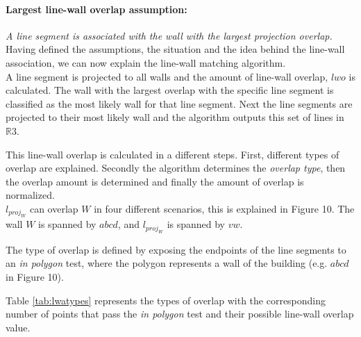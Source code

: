 	\paragraph{Largest line-wall overlap assumption:}
	\emph{A line segment is associated with the wall with the largest projection
	overlap.}\\
	Having defined the assumptions, the situation and the idea behind the
	line-wall association, we can now explain the line-wall matching algorithm.\\ 

	A line segment is projected to all walls and the amount of line-wall
	overlap, $lwo$ is calculated. The wall with the largest overlap with the specific line
segment is classified as the most likely wall for that line segment.
	Next the line segments are projected to their most likely wall and the
	algorithm outputs this set of lines in $\mathbb{R}3$. 
	

	This line-wall overlap is calculated in a different steps.
	First, different types of overlap are explained. Secondly the algorithm
	determines the \emph{overlap type}, then the overlap amount is determined and
	finally the amount of overlap is normalized.\\

	$l_{proj_W}$ can overlap $W$ in four different scenarios, this is explained
	in Figure 10. The wall $W$ is spanned by $abcd$, and $l_{proj_W}$ is spanned
	by $vw$.
	
		
	\clearpage


	The type of overlap is defined by exposing the endpoints of the line
	segments to an \emph{in polygon} test, where the polygon represents a 
	wall of the building (e.g. $abcd$ in Figure 10).

	Table \ref{tab:lwatypes} represents the types of overlap with the corresponding number of points
	that pass the \emph{in polygon} test and their possible line-wall overlap
	value.\\ 

